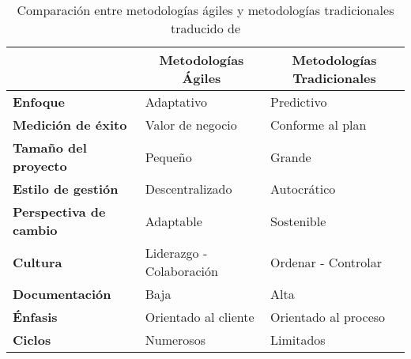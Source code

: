 \begin{table}[H]
    \centering
    \caption[Comparación entre metodologías ágiles y metodologías tradicionales]{Comparación entre metodologías ágiles y metodologías tradicionales traducido de \cite{islam_comparison_2020} }\label{tab:table_agil_vs_tradicional}
    \renewcommand*{\arraystretch}{1.4}
    \begin{footnotesize}
    \begin{tabular}{ |>{\bfseries}l|l|l| }
        \hline
        \multicolumn{1}{|c|}{ \textbf{Característica}} & \multicolumn{1}{c|}{\textbf{Metodologías Ágiles}} & \multicolumn{1}{c|}{ \textbf{Metodologías Tradicionales}} \\
        \hline
        Enfoque                                      & Adaptativo                                       & Predictivo                                               \\
        \hline
        Medición de éxito                            & Valor de negocio                                 & Conforme al plan                                         \\
        \hline
        Tamaño
        del proyecto                                & Pequeño                                           & Grande                                                   \\
        \hline
        Estilo de gestión                            & Descentralizado                                  & Autocrático                                              \\
        \hline
        Perspectiva de cambio                        & Adaptable                                        & Sostenible                                 \\
        \hline
        Cultura                                      & Liderazgo - Colaboración                         & Ordenar - Controlar                                      \\
        \hline
        Documentación                                & Baja                                             & Alta                                                     \\
        \hline
        Énfasis                                      & Orientado al cliente                             & Orientado al proceso                                     \\
        \hline
        Ciclos                                       & Numerosos                                        & Limitados                                                \\

\end{tabular}
\end{footnotesize}
\end{table}
